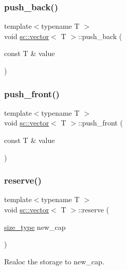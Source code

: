 \subsubsection{\texorpdfstring{push\+\_\+back()}{push\_back()}}
{\footnotesize\ttfamily template$<$typename T $>$ \\
void \hyperlink{classsc_1_1vector}{sc\+::vector}$<$ T $>$\+::push\+\_\+back (\begin{DoxyParamCaption}\item[{const T \&}]{value }\end{DoxyParamCaption})}

\mbox{\label{classsc_1_1vector_a013daac15aada32590d4372c0cbc610a}} 
\subsubsection{\texorpdfstring{push\+\_\+front()}{push\_front()}}
{\footnotesize\ttfamily template$<$typename T $>$ \\
void \hyperlink{classsc_1_1vector}{sc\+::vector}$<$ T $>$\+::push\+\_\+front (\begin{DoxyParamCaption}\item[{const T \&}]{value }\end{DoxyParamCaption})}

\mbox{\label{classsc_1_1vector_adf9b78a735c50b4c4447ab8df5cab49e}} 
\subsubsection{\texorpdfstring{reserve()}{reserve()}}
{\footnotesize\ttfamily template$<$typename T $>$ \\
void \hyperlink{classsc_1_1vector}{sc\+::vector}$<$ T $>$\+::reserve (\begin{DoxyParamCaption}\item[{\hyperlink{classsc_1_1vector_aa4500ebad5be45f8d469fc4b5d62b19d}{size\+\_\+type}}]{new\+\_\+cap }\end{DoxyParamCaption})\hspace{0.3cm}{\ttfamily [inline]}}



Realoc the storage to new\+\_\+cap. 

